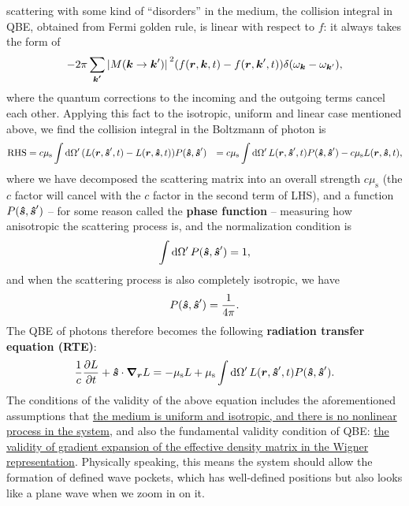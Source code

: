 \documentclass[hyperref, a4paper]{article}
\newcommand*{\concept}[1]{{\textbf{#1}}}
\def\\{}%
\begin{document}
scattering with some kind of ``disorders'' in the medium, 
the collision integral in QBE, obtained from Fermi golden rule, 
is linear with respect to $f$: 
it always takes the form of 
\[
    - 2\pi \sum_{\vb*{k'}} \abs*{M(\vb*{k} \to \vb*{k}')}^2 (f(\vb*{r}, \vb*{k} , t) - f(\vb*{r}, \vb*{k}', t) )
    \delta(\omega_{\vb*{k}} - \omega_{\vb*{k}'}),
\] 
where the quantum corrections to the incoming and the outgoing terms 
cancel each other. 
Applying this fact to the isotropic, uniform and linear case 
mentioned above, we find the collision integral in the 
Boltzmann of photon is 
\begin{equation}
    \begin{aligned}
        \text{RHS} &= c \mu_{\text{s}} \int \dd{\Omega'} (L(\vb*{r}, \vu*{s}', t) - L(\vb*{r}, \vu*{s}, t)) P(\vu*{s}, \vu*{s}') \\
        &= c \mu_{\text{s}} \int \dd{\Omega'} L(\vb*{r}, \vu*{s}', t)  P(\vu*{s}, \vu*{s}')
        - c \mu_{\text{s}} L(\vb*{r}, \vu*{s}, t) ,
    \end{aligned}
\end{equation}
where we have decomposed the scattering matrix 
into an overall strength $c \mu_{\text{s}}$ 
(the $c$ factor will cancel with the $c$ factor in the second term of LHS), 
and a function $P(\vu*{s}, \vu*{s}')$ -- for some reason called the \concept{phase function} -- 
measuring how anisotropic the scattering process is, 
and the normalization condition is 
\begin{equation}
    \int \dd{\Omega'} P(\vu*{s}, \vu*{s}') = 1,
\end{equation}
and when the scattering process is also completely isotropic, we have 
\begin{equation}
    P(\vu*{s}, \vu*{s}') = \frac{1}{4 \pi}.
\end{equation}
The QBE of photons therefore becomes the following 
\concept{radiation transfer equation (RTE)}: 
\begin{equation}
    \frac{1}{c} \pdv{L}{t} + \vu*{s} \cdot \grad_{\vb*{r}} L = 
    - \mu_{\text{s}} L + \mu_{\text{s}} \int \dd{\Omega'} 
    L(\vb*{r}, \vu*{s}', t) P(\vu*{s}, \vu*{s}').
    \label{eq:rad-transfer-1}
\end{equation}
The conditions of the validity of the above equation 
includes the aforementioned assumptions that 
\ul{the medium is uniform and isotropic, 
and there is no nonlinear process in the system,} 
and also the fundamental validity condition of QBE: 
\ul{the validity of gradient expansion of the effective density matrix 
in the Wigner representation}.
Physically speaking, this means the system should allow 
the formation of defined wave pockets, 
which has well-defined positions 
but also looks like a plane wave when we zoom in on it. 
\end{document}
